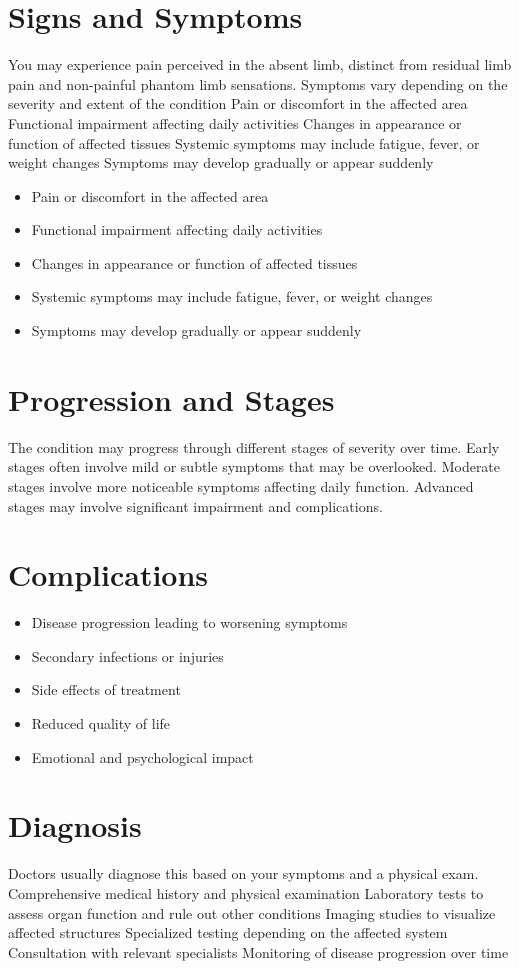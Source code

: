\section{Signs and Symptoms}
You may experience pain perceived in the absent limb, distinct from residual limb pain and non-painful phantom limb sensations. Symptoms vary depending on the severity and extent of the condition Pain or discomfort in the affected area Functional impairment affecting daily activities Changes in appearance or function of affected tissues Systemic symptoms may include fatigue, fever, or weight changes Symptoms may develop gradually or appear suddenly

\begin{itemize}[noitemsep]
  \item Pain or discomfort in the affected area
  \item Functional impairment affecting daily activities
  \item Changes in appearance or function of affected tissues
  \item Systemic symptoms may include fatigue, fever, or weight changes
  \item Symptoms may develop gradually or appear suddenly
\end{itemize}
\section{Progression and Stages}
The condition may progress through different stages of severity over time. Early stages often involve mild or subtle symptoms that may be overlooked. Moderate stages involve more noticeable symptoms affecting daily function. Advanced stages may involve significant impairment and complications.
\section{Complications}
\begin{itemize}[noitemsep]
  \item Disease progression leading to worsening symptoms
  \item Secondary infections or injuries
  \item Side effects of treatment
  \item Reduced quality of life
  \item Emotional and psychological impact
\end{itemize}
\section{Diagnosis}
Doctors usually diagnose this based on your symptoms and a physical exam. Comprehensive medical history and physical examination Laboratory tests to assess organ function and rule out other conditions Imaging studies to visualize affected structures Specialized testing depending on the affected system Consultation with relevant specialists Monitoring of disease progression over time

